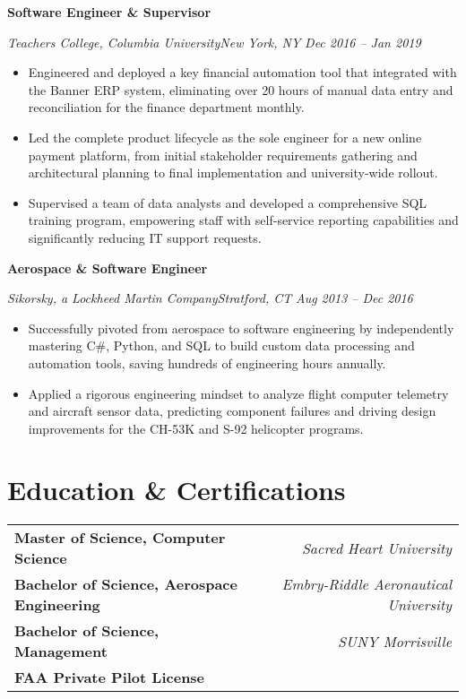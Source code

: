 \documentclass[11pt,letterpaper]{article}
\newlength{\spacingBetweenJobs}          \setlength{\spacingBetweenJobs}{10pt}
\newlength{\spacingAfterJobHeader}       \setlength{\spacingAfterJobHeader}{0.8em}
\newcommand{\jobtitle}[4]{%
  \noindent%
  {\bfseries\large #1}\par%
  \vspace{0.2em}%
  \textcolor{colorSubtle}{%
    \textit{#2\enspace\textbullet\enspace#3}%
    \hfill%
    \textit{\small #4}%
  }\par%
  \vspace{\spacingAfterJobHeader}%
}
\begin{document}
\jobtitle{Software Engineer \& Supervisor}{Teachers College, Columbia University}{New York, NY}{Dec 2016 -- Jan 2019}
\begin{itemize}
    \item Engineered and deployed a key financial automation tool that integrated with the Banner ERP system, eliminating over 20 hours of manual data entry and reconciliation for the finance department monthly.
    \item Led the complete product lifecycle as the sole engineer for a new online payment platform, from initial stakeholder requirements gathering and architectural planning to final implementation and university-wide rollout.
    \item Supervised a team of data analysts and developed a comprehensive SQL training program, empowering staff with self-service reporting capabilities and significantly reducing IT support requests.
\end{itemize}
\vspace{\spacingBetweenJobs}

\jobtitle{Aerospace \& Software Engineer}{Sikorsky, a Lockheed Martin Company}{Stratford, CT}{Aug 2013 -- Dec 2016}
\begin{itemize}
    \item Successfully pivoted from aerospace to software engineering by independently mastering C\#, Python, and SQL to build custom data processing and automation tools, saving hundreds of engineering hours annually.
    \item Applied a rigorous engineering mindset to analyze flight computer telemetry and aircraft sensor data, predicting component failures and driving design improvements for the CH-53K and S-92 helicopter programs.
\end{itemize}
\vspace{\spacingBetweenJobs}

\section*{Education \& Certifications}
\begin{tabularx}{\textwidth}{@{} >{\raggedright}X r @{}}
  \textbf{Master of Science, Computer Science} & \textit{Sacred Heart University} \\
  \textbf{Bachelor of Science, Aerospace Engineering} & \textit{Embry-Riddle Aeronautical University} \\
  \textbf{Bachelor of Science, Management} & \textit{SUNY Morrisville} \\
  \textbf{FAA Private Pilot License} & \\
\end{tabularx}
\end{document}
